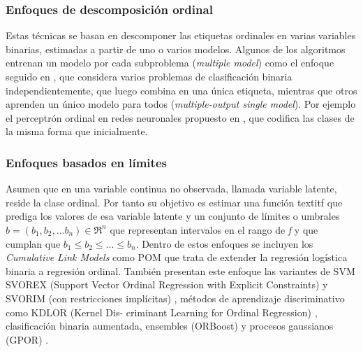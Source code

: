 \subsubsection{Enfoques de descomposición ordinal}
Estas técnicas se basan en descomponer las etiquetas ordinales en varias variables binarias, estimadas a partir de uno o varios modelos. Algunos de los algoritmos entrenan un modelo por cada subproblema (\textit{multiple model}) como el enfoque seguido en \cite{Hall}, que considera varios problemas de clasificación binaria independientemente, que luego combina en una única etiqueta, mientras que otros aprenden un único modelo para todos (\textit{multiple-output single model}). Por ejemplo el perceptrón ordinal en redes neuronales propuesto en \cite{cheng2008neural}, que codifica las clases de la misma forma que \cite{Hall} inicialmente.
\subsubsection{Enfoques basados en límites}
Asumen que en una variable continua no observada, llamada variable latente, reside la clase ordinal. Por tanto su objetivo es estimar una función textit{f} que prediga los valores de esa variable latente y un conjunto de límites o umbrales $b= (b_1,b_2,...b_n) \in \Re^n$ que representan intervalos en el rango de \textit{f} y que cumplan que $b_1 \le b_2 \le ... \le b_n$. Dentro de estos enfoques se incluyen los \textit{Cumulative Link Models} como POM \cite{mccullagh1980regression} que trata de extender la regresión logística binaria a regresión ordinal. También presentan este enfoque las variantes de SVM  SVOREX (Support Vector Ordinal Regression with
Explicit Constraints) y SVORIM (con restricciones implícitas) \cite{chu2007support}, métodos de aprendizaje discriminativo como KDLOR (Kernel Dis-
criminant Learning for Ordinal Regression) \cite{sun2010kernel}, clasificación binaria aumentada, ensembles (ORBoost) \cite{lin2006large} y procesos gaussianos (GPOR) \cite{chu2005gaussian}.
